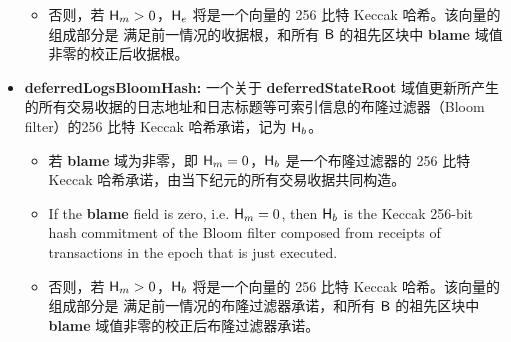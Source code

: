 \begin{itemize}[nosep]
\begin{itemize}
		\item 否则，若 $\textsf{H}_m>0$，$\textsf{H}_e$ 将是一个向量的 256 比特 Keccak 哈希。该向量的组成部分是 满足前一情况的收据根，和所有 $\textsf{B}$ 的祖先区块中 {\bf blame} 域值非零的校正后收据根。
	\end{itemize}
	
	
	\item {\bf deferredLogsBloomHash:} 一个关于 {\bf deferredStateRoot} 域值更新所产生的所有交易收据的日志地址和日志标题等可索引信息的布隆过滤器（Bloom filter）的256 比特 Keccak 哈希承诺，记为 $\textsf{H}_b$。	
	\begin{itemize}
		\item 若 {\bf blame} 域为非零，即 $\textsf{H}_m=0$，$\textsf{H}_b$ 是一个布隆过滤器的 256 比特 Keccak 哈希承诺，由当下纪元的所有交易收据共同构造。
		\item If the {\bf blame} field is zero, i.e. $\textsf{H}_m=0$, then $\textsf{H}_b$ is the Keccak 256-bit hash commitment of the Bloom filter composed from receipts of transactions in the epoch that is just executed.
	
		\item 否则，若 $\textsf{H}_m>0$，$\textsf{H}_b$ 将是一个向量的 256 比特 Keccak 哈希。该向量的组成部分是 满足前一情况的布隆过滤器承诺，和所有 $\textsf{B}$ 的祖先区块中 {\bf blame} 域值非零的校正后布隆过滤器承诺。
	\end{itemize}


\end{itemize}
